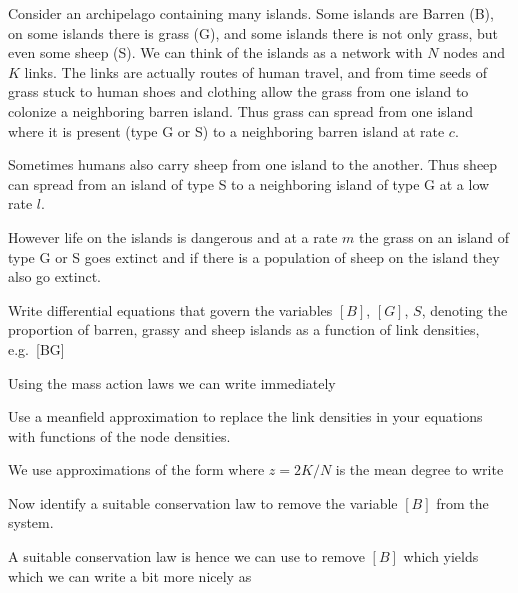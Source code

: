 Consider an archipelago containing many islands. Some islands are Barren (B), on some islands there is grass (G), and some islands there is not only grass, but even some sheep (S). We can think of the islands as a network with $N$ nodes and $K$ links. The links are actually routes of human travel, and from time seeds of grass stuck to human shoes and clothing allow the grass from one island to colonize a neighboring barren island. Thus grass can spread from one island where it is present (type G or S) to a neighboring barren island at rate $c$.  

Sometimes humans also carry sheep from one island to the another. Thus sheep can spread from an island of type S to a neighboring island of type G at a low rate $l$.

However life on the islands is dangerous and at a rate $m$ the grass on an island of type G or S goes extinct and if there is a population of sheep on the island they also go extinct. 

\subquestion 
Write differential equations that govern the variables $[B]$, $[G]$, ${S}$, denoting the proportion of barren, grassy and sheep islands as a function of link densities, 
e.g.~[BG]

\solution
Using the mass action laws we can write immediately

\subquestion 
Use a meanfield approximation to replace the link densities in your equations with functions of the node densities. 

\solution
We use approximations of the form  
where $z=2K/N$ is the mean degree to write 

\subquestion
Now identify a suitable conservation law to remove the variable $[B]$ from the system.

\solution
A suitable conservation law is 
hence we can use 
to remove $[B]$ which yields
which we can write a bit more nicely as 

